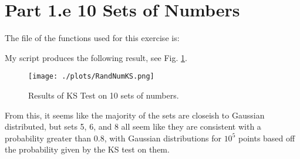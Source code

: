 \section{Part 1.e 10 Sets of Numbers}

The file of the functions used for this exercise is:



My script produces the following result, see Fig. \ref{fig:10_sets}.

\begin{figure}[h!]
  \centering
  \texttt{[image: ./plots/RandNumKS.png]}
  \caption{Results of KS Test on 10 sets of numbers.}
  \label{fig:10_sets}
\end{figure}

From this, it seems like the majority of the sets are closeish to Gaussian distributed, but sets 5, 6, and 8 all seem like
they are consistent with a probability greater than 0.8, with Gaussian distributions for $10^5$ points based off the probability given by the KS test on them.

